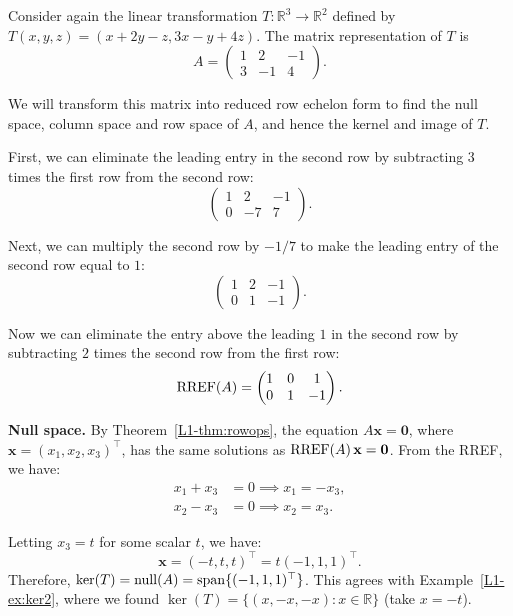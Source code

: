 \begin{example}\label{L1-ex:worked}
    Consider again the linear transformation $T: \mathbb{R}^3 \to \mathbb{R}^2$ defined by $T(x, y, z) = (x + 2y - z, 3x - y + 4z)$. The matrix representation of $T$ is
    \[A = \begin{pmatrix}
        1 & 2 & -1 \\
        3 & -1 & 4
    \end{pmatrix}.\]

    We will transform this matrix into reduced row echelon form to find the null space, column space and row space of $A$, and hence the kernel and image of $T$.

    First, we can eliminate the leading entry in the second row by subtracting $3$ times the first row from the second row:
    \[\begin{pmatrix}
        1 & 2 & -1 \\
        0 & -7 & 7
    \end{pmatrix}.\]

    Next, we can multiply the second row by $-1/7$ to make the leading entry of the second row equal to $1$:
    \[\begin{pmatrix}
        1 & 2 & -1 \\
        0 & 1 & -1
    \end{pmatrix}.\]

    Now we can eliminate the entry above the leading $1$ in the second row by subtracting $2$ times the second row from the first row:
    \[\operatorname{RREF}(A) = \begin{pmatrix}
        1 & 0 & 1 \\
        0 & 1 & -1
    \end{pmatrix}.\]

    \textbf{Null space.} By Theorem~\ref{L1-thm:rowops}, the equation $A\mathbf{x} = \mathbf{0}$, where $\mathbf{x} = (x_1, x_2, x_3)^\top$, has the same solutions as $\operatorname{RREF}(A)\,\mathbf{x} = \mathbf{0}$. From the RREF, we have:
    \begin{align*}
        x_1 + x_3 &= 0 \implies x_1 = -x_3, \\
        x_2 - x_3 &= 0 \implies x_2 = x_3.
    \end{align*}

    Letting $x_3 = t$ for some scalar $t$, we have:
    \[\mathbf{x} = (-t, t, t)^\top = t(-1, 1, 1)^\top.\]
    Therefore, $\ker(T) = \operatorname{null}(A) = \operatorname{span}\{(-1, 1, 1)^\top\}$. This agrees with Example~\ref{L1-ex:ker2}, where we found $\ker(T) = \{(x, -x, -x) : x \in \mathbb{R}\}$ (take $x = -t$).


\end{example}
